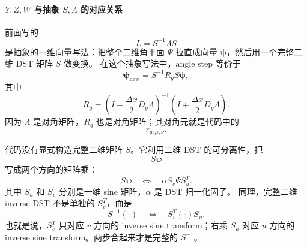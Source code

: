 \documentclass[11pt,a4paper]{ctexart}
\begin{document}
\paragraph{\(Y,Z,W\) 与抽象 \(S,\Lambda\) 的对应关系}
前面写的
\begin{equation}
  L=S^{-1}\Lambda S
\end{equation}
是抽象的一维向量写法：把整个二维角平面 \(\Psi\) 拉直成向量
\(\boldsymbol\psi\)，然后用一个完整二维 DST 矩阵 \(S\) 做变换。
在这个抽象写法中，angle step 等价于
\begin{equation}
  \boldsymbol\psi_{\mathrm{new}}
  =
  S^{-1}R_gS\boldsymbol\psi,
\end{equation}
其中
\begin{equation}
  R_g
  =
  \left(I-\frac{\Delta x}{2}D_g\Lambda\right)^{-1}
  \left(I+\frac{\Delta x}{2}D_g\Lambda\right).
\end{equation}
因为 \(\Lambda\) 是对角矩阵，\(R_g\) 也是对角矩阵；其对角元就是代码中的
\begin{equation}
  r_{g,\mu,\nu}.
\end{equation}

代码没有显式构造完整二维矩阵 \(S\)。它利用二维 DST 的可分离性，把
\begin{equation}
  S\boldsymbol\psi
\end{equation}
写成两个方向的矩阵乘：
\begin{equation}
  S\boldsymbol\psi
  \quad\Longleftrightarrow\quad
  \alpha S_v\Psi S_u^T.
\end{equation}
其中 \(S_u\) 和 \(S_v\) 分别是一维 sine 矩阵，\(\alpha\) 是 DST 归一化因子。
同理，完整二维 inverse DST 不是单独的 \(S_v^T\)，而是
\begin{equation}
  S^{-1}(\cdot)
  \quad\Longleftrightarrow\quad
  S_v^T(\cdot)S_u.
\end{equation}
也就是说，\(S_v^T\) 只对应 \(v\) 方向的 inverse sine transform；右乘 \(S_u\)
对应 \(u\) 方向的 inverse sine transform。两步合起来才是完整的 \(S^{-1}\)。
\end{document}
